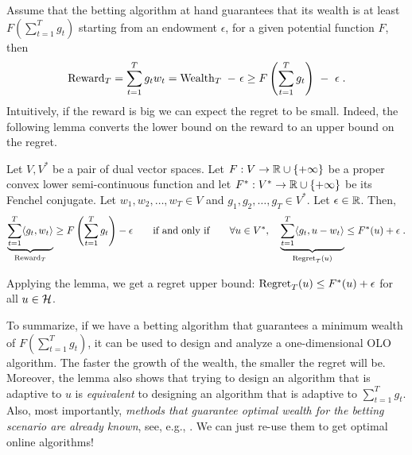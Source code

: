 Assume that the betting algorithm at hand guarantees that its wealth is at least
$F(\sum_{t=1}^T g_t)$ starting from an endowment $\epsilon$, for a given
potential function $F$, then
\vspace{-.1cm}
\begin{equation}
\label{equation:one-dimensional-olo-reward-lower-bound}
\Reward_T
= \sum_{t=1}^T g_t w_t
= \Wealth_T \ - \ \epsilon \ge F\left(\sum_{t=1}^T g_t \right) \ - \ \epsilon \; .
\end{equation}
Intuitively, if the reward is big  we can expect the regret to be small. Indeed,
the following lemma converts the lower bound on the reward to an upper bound on
the regret.
\begin{lemma}
\label{lemma:reward-regret}
Let $V,V^*$ be a pair of dual vector spaces. Let $F:V \to \mathbb{R} \cup \{+\infty\}$
be a proper convex lower semi-continuous function and let $F^*:V^* \to \mathbb{R} \cup
\{+\infty\}$ be its Fenchel conjugate. Let $w_1, w_2, \dots, w_T \in V$ and
$g_1, g_2, \dots, g_T \in V^*$. Let $\epsilon \in \mathbb{R}$. Then,
\[
\underbrace{\sum_{t=1}^T \langle g_t, w_t \rangle}_{\operatorname{Reward}_T} \ge F\left( \sum_{t=1}^T g_t \right) -\epsilon
\qquad \text{if and only if} \qquad
\forall u \in V^*, \quad
\underbrace{\sum_{t=1}^T \langle g_t, u - w_t\rangle}_{\operatorname{Regret}_T(u)} \le F^*(u) + \epsilon\; .
\]
\end{lemma}
\vspace{-.1cm}
Applying the lemma, we get a regret upper bound:
$\operatorname{Regret}_T(u) \le F^*(u) + \epsilon$ for all $u \in \mathcal{H}$.

To summarize, if we have a betting algorithm that guarantees a minimum wealth
of $F(\sum_{t=1}^T g_t)$, it can be used to design and analyze a
one-dimensional \ac{OLO} algorithm. The faster the growth of the wealth, the
smaller the regret will be.  Moreover, the lemma also shows that trying to
design an algorithm that is adaptive to $u$ is \emph{equivalent} to designing
an algorithm that is adaptive to $\sum_{t=1}^T g_t$.  Also, most importantly,
\emph{methods that guarantee optimal wealth for the betting scenario are
already known}, see, e.g., \cite[Chapter 9]{Cesa-Bianchi-Lugosi-2006}. We can
just re-use them to get optimal online algorithms!
